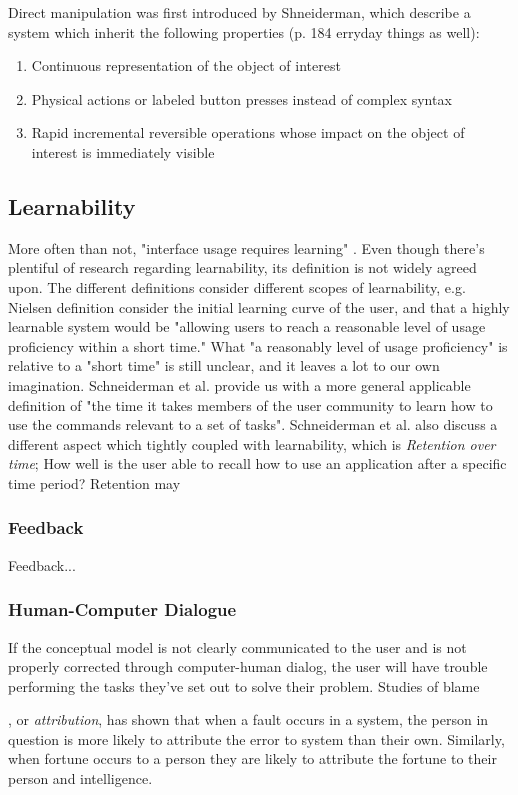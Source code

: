 Direct manipulation was first introduced by Shneiderman, which describe a system which inherit the following properties (p. 184 erryday things as well):

\begin{enumerate}
  \item Continuous representation of the object of interest
  \item Physical actions or labeled button presses instead of complex syntax
  \item Rapid incremental reversible operations whose impact on the object of interest is immediately visible
\end{enumerate}

\subsection{Learnability}
More often than not, "interface usage requires learning" \cite{Grossman2009}. Even though there’s plentiful of research regarding learnability, its definition is not widely agreed upon. The different definitions consider different scopes of learnability, e.g. Nielsen definition consider the initial learning curve of the user, and that a highly learnable system would be "allowing users to reach a reasonable level of usage proficiency within a short time." What "a reasonably level of usage proficiency" is relative to a "short time" is still unclear, and it leaves a lot to our own imagination. Schneiderman et al. provide us with a more general applicable definition of "the time it takes members of the user community to learn how to use the commands relevant to a set of tasks". Schneiderman et al. also discuss a different aspect which tightly coupled with learnability, which is \textit{Retention over time}; How well is the user able to recall how to use an application after a specific time period? Retention may

\subsubsection{Feedback}
Feedback...

\subsubsection{Human-Computer Dialogue}

If the conceptual model is not clearly communicated to the user and is not properly corrected through computer-human dialog, the user will have trouble performing the tasks they've set out to solve their problem. Studies of blame , or \textit{attribution}, has shown that when a fault occurs in a system, the person in question is more likely to attribute the error to system than their own. Similarly, when fortune occurs to a person they are likely to attribute the fortune to their person and intelligence.

